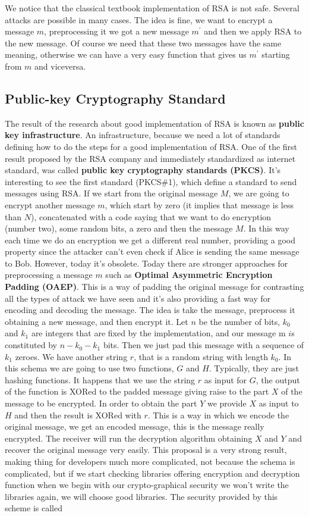 \documentclass[11pt]{article}
\begin{document}
We notice that the classical textbook implementation of RSA is not safe. Several attacks are possible in many cases. The idea is fine, we want to encrypt a message $m$, preprocessing it we got a new message $m^{'}$ and then we apply RSA to the new message. Of course we need that these two messages have the same meaning, otherwise we can have a very easy function that
gives us $m^{'}$ starting from $m$ and viceversa.
\subsection{Public-key Cryptography Standard}
The result of the research about good implementation of RSA is known as \textbf{public key infrastructure}. An infrastructure, because we need a lot of standards defining how to do the steps for a good implementation of RSA. One of the first result proposed by the RSA company and immediately standardized as internet standard, was called \textbf{public key cryptography standards (PKCS)}. It's interesting to see the first standard (PKCS\#1), which define a standard to send messages using RSA. If we start from the original message $M$, we are going to encrypt another message $m$, which start by zero (it implies that message is less than $N$), concatenated with a code saying that we want to do encryption (number two), some random bits, a zero and then the message $M$. In this way each time we do an encryption we get a different real number, providing a good property since the attacker can't even check if Alice is sending the same message to Bob. However, today it's obsolete. Today there are stronger approaches for preprocessing a message $m$ such as \textbf{Optimal Asymmetric Encryption Padding (OAEP)}. This is a way of padding the original message for contrasting all the types of attack we have seen and it's also providing a fast way for encoding and decoding the message. The idea is take the message, preprocess it obtaining a new message, and then encrypt it. Let $n$ be the number of bits, $k_0$ and $k_1$ are integers that are fixed by the implementation, and our message m $i$s constituted by $n - k_0 - k_1$ bits. Then we just pad this message with a sequence of $k_1$ zeroes. We have another string $r$, that is a random string with length $k_0$. In this schema we are going to use two functions, $G$ and $H$. Typically, they are just hashing functions. It happens that we use the string $r$ as input for $G$, the output of the function is XORed to the padded message giving raise to the part $X$ of the message to be encrypted. In order to obtain the part $Y$ we provide $X$ as input to $H$ and then the result is XORed with $r$. This is a way in which we encode the original message, we get an encoded message, this is the message really encrypted. The receiver will run the decryption algorithm obtaining $X$ and $Y$ and recover the original message very easily. This proposal is a very strong result, making thing for developers much more complicated, not because the schema is complicated, but if we start checking libraries offering encryption and decryption function when we begin with our crypto-graphical security we won't write the libraries again, we will choose good libraries. The security provided by this scheme is called 
\end{document}
